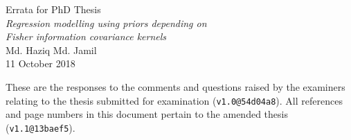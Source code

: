 \documentclass[11pt,openright,twoside]{report}
\begin{document}
\pagestyle{chaptererr}

\begin{center}
  {\Large Errata for PhD Thesis} \\[0.5em]
  \textit{\large Regression modelling using priors depending on} \\[-0.2em]
  \textit{\large Fisher information covariance kernels} \\[0.5em]
  {\large Md. Haziq Md. Jamil} \\
  {\large 11 October 2018}
\end{center}

\vspace{2em}

These are the responses to the comments and questions raised by the examiners relating to the thesis submitted for examination (\verb|v1.0@54d04a8|).
All references and page numbers in this document pertain to the amended thesis (\verb|v1.1@13baef5|).
\end{document}
